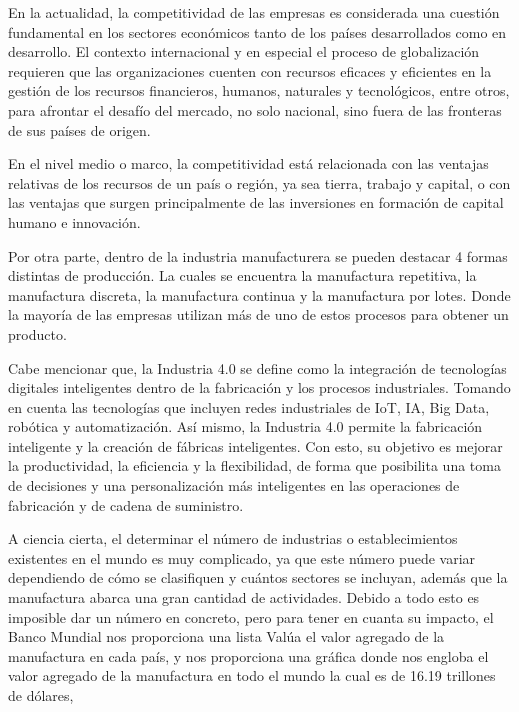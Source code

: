         En la actualidad, la competitividad de las empresas es considerada una cuestión fundamental en los sectores económicos tanto de los países desarrollados como en desarrollo. El contexto internacional y en especial el proceso de globalización requieren que las organizaciones cuenten con recursos eficaces y eficientes en la gestión de los recursos financieros, humanos, naturales y tecnológicos, entre otros, para afrontar el desafío del mercado, no solo nacional, sino fuera de las fronteras de sus países de origen. \cite{labarca2007consideraciones}
        
        En el nivel medio o marco, la competitividad está relacionada con las ventajas relativas de los recursos de un país o región, ya sea tierra, trabajo y capital, o con las ventajas que surgen principalmente de las inversiones en formación de capital humano e innovación. \cite{padilla2006instrumento}
        
    
       Por otra parte, dentro de la industria manufacturera se pueden destacar 4 formas distintas de producción. La cuales se encuentra la manufactura repetitiva, la manufactura discreta, la manufactura continua y la manufactura por lotes. Donde la mayoría de las empresas utilizan más de uno de estos procesos para obtener un producto. \cite{JavierA}
        
        Cabe mencionar que, la Industria 4.0 se define como la integración de tecnologías digitales inteligentes dentro de la fabricación y los procesos industriales. Tomando en cuenta las tecnologías que incluyen redes industriales de IoT, IA, Big Data, robótica y automatización. Así mismo, la Industria 4.0 permite la fabricación inteligente y la creación de fábricas inteligentes. Con esto, su objetivo es mejorar la productividad, la eficiencia y la flexibilidad, de forma que posibilita una toma de decisiones y una personalización más inteligentes en las operaciones de fabricación y de cadena de suministro. \cite{SAP}
    
    
    A ciencia cierta, el determinar el número de industrias o establecimientos existentes en el mundo es muy complicado, ya que este número puede variar dependiendo de cómo se clasifiquen y cuántos sectores se incluyan, además que la manufactura abarca una gran cantidad de actividades. Debido a todo esto es imposible dar un número en concreto, pero para tener en cuanta su impacto, el Banco Mundial nos proporciona una lista Valúa el valor agregado de la manufactura en cada país, y nos proporciona una gráfica donde nos engloba el valor agregado de la manufactura en todo el mundo la cual es de 16.19 trillones de dólares,
    
